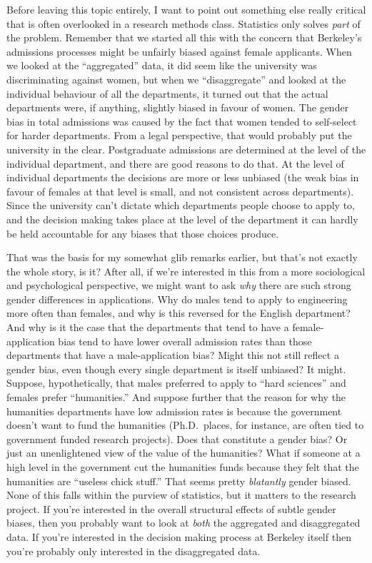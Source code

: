 \documentclass[
]{book}
\begin{document}
Before leaving this topic entirely, I want to point out something else really critical that is often overlooked in a research methods class. Statistics only solves \emph{part} of the problem. Remember that we started all this with the concern that Berkeley's admissions processes might be unfairly biased against female applicants. When we looked at the ``aggregated'' data, it did seem like the university was discriminating against women, but when we ``disaggregate'' and looked at the individual behaviour of all the departments, it turned out that the actual departments were, if anything, slightly biased in favour of women. The gender bias in total admissions was caused by the fact that women tended to self-select for harder departments. From a legal perspective, that would probably put the university in the clear. Postgraduate admissions are determined at the level of the individual department, and there are good reasons to do that. At the level of individual departments the decisions are more or less unbiased (the weak bias in favour of females at that level is small, and not consistent across departments). Since the university can't dictate which departments people choose to apply to, and the decision making takes place at the level of the department it can hardly be held accountable for any biases that those choices produce.

That was the basis for my somewhat glib remarks earlier, but that's not exactly the whole story, is it? After all, if we're interested in this from a more sociological and psychological perspective, we might want to ask \emph{why} there are such strong gender differences in applications. Why do males tend to apply to engineering more often than females, and why is this reversed for the English department? And why is it the case that the departments that tend to have a female-application bias tend to have lower overall admission rates than those departments that have a male-application bias? Might this not still reflect a gender bias, even though every single department is itself unbiased? It might. Suppose, hypothetically, that males preferred to apply to ``hard sciences'' and females prefer ``humanities.'' And suppose further that the reason for why the humanities departments have low admission rates is because the government doesn't want to fund the humanities (Ph.D.~places, for instance, are often tied to government funded research projects). Does that constitute a gender bias? Or just an unenlightened view of the value of the humanities? What if someone at a high level in the government cut the humanities funds because they felt that the humanities are ``useless chick stuff.'' That seems pretty \emph{blatantly} gender biased. None of this falls within the purview of statistics, but it matters to the research project. If you're interested in the overall structural effects of subtle gender biases, then you probably want to look at \emph{both} the aggregated and disaggregated data. If you're interested in the decision making process at Berkeley itself then you're probably only interested in the disaggregated data.
\end{document}
